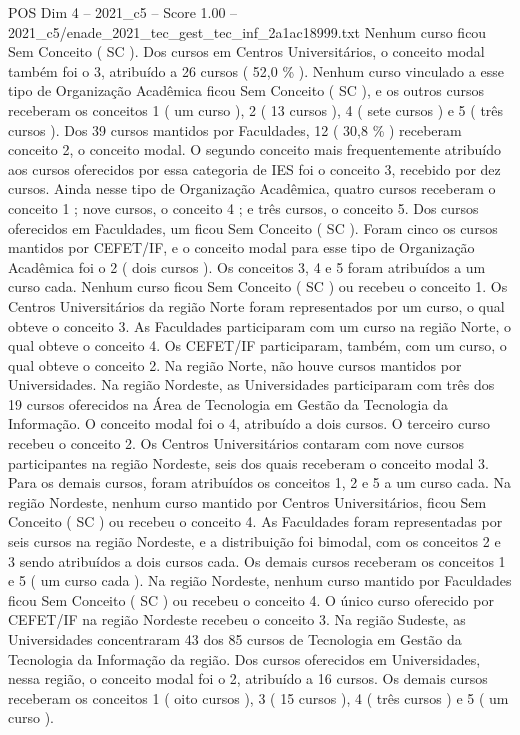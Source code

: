 \begin{textsample}{POS Dim 4 – 2021\_c5 – Score 1.00 – 2021\_c5/enade\_2021\_tec\_gest\_tec\_inf\_2a1ac18999.txt}
Nenhum curso ficou Sem Conceito ( SC ).
Dos cursos em Centros Universitários, o conceito modal também foi o 3, atribuído a 26 cursos ( 52,0 \% ).
Nenhum curso vinculado a esse tipo de Organização Acadêmica ficou Sem Conceito ( SC ), e os outros cursos receberam os conceitos 1 ( um curso ), 2 ( 13 cursos ), 4 ( sete cursos ) e 5 ( três cursos ).
Dos 39 cursos mantidos por Faculdades, 12 ( 30,8 \% ) receberam conceito 2, o conceito modal.
O segundo conceito mais frequentemente atribuído aos cursos oferecidos por essa categoria de IES foi o conceito 3, recebido por dez cursos.
Ainda nesse tipo de Organização Acadêmica, quatro cursos receberam o conceito 1 ; nove cursos, o conceito 4 ; e três cursos, o conceito 5.
Dos cursos oferecidos em Faculdades, um ficou Sem Conceito ( SC ).
Foram cinco os cursos mantidos por CEFET/IF, e o conceito modal para esse tipo de Organização Acadêmica foi o 2 ( dois cursos ).
Os conceitos 3, 4 e 5 foram atribuídos a um curso cada.
Nenhum curso ficou Sem Conceito ( SC ) ou recebeu o conceito 1.
Os Centros Universitários da região Norte foram representados por um curso, o qual obteve o conceito 3.
As Faculdades participaram com um curso na região Norte, o qual obteve o conceito 4.
Os CEFET/IF participaram, também, com um curso, o qual obteve o conceito 2.
Na região Norte, não houve cursos mantidos por Universidades.
Na região Nordeste, as Universidades participaram com três dos 19 cursos oferecidos na Área de Tecnologia em Gestão da Tecnologia da Informação.
O conceito modal foi o 4, atribuído a dois cursos.
O terceiro curso recebeu o conceito 2.
Os Centros Universitários contaram com nove cursos participantes na região Nordeste, seis dos quais receberam o conceito modal 3.
Para os demais cursos, foram atribuídos os conceitos 1, 2 e 5 a um curso cada.
Na região Nordeste, nenhum curso mantido por Centros Universitários, ficou Sem Conceito ( SC ) ou recebeu o conceito 4.
As Faculdades foram representadas por seis cursos na região Nordeste, e a distribuição foi bimodal, com os conceitos 2 e 3 sendo atribuídos a dois cursos cada.
Os demais cursos receberam os conceitos 1 e 5 ( um curso cada ).
Na região Nordeste, nenhum curso mantido por Faculdades ficou Sem Conceito ( SC ) ou recebeu o conceito 4.
O único curso oferecido por CEFET/IF na região Nordeste recebeu o conceito 3.
Na região Sudeste, as Universidades concentraram 43 dos 85 cursos de Tecnologia em Gestão da Tecnologia da Informação da região.
Dos cursos oferecidos em Universidades, nessa região, o conceito modal foi o 2, atribuído a 16 cursos.
Os demais cursos receberam os conceitos 1 ( oito cursos ), 3 ( 15 cursos ), 4 ( três cursos ) e 5 ( um curso ).

\end{textsample}
